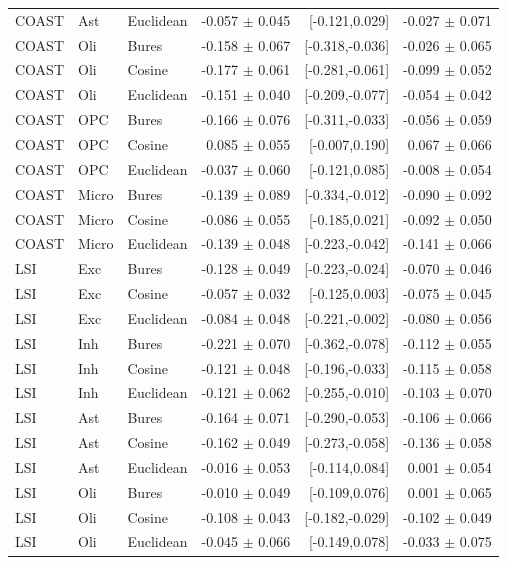 \documentclass[9pt]{article}
\begin{document}
\begin{landscape}
\begin{longtable}{lllrrr}
COAST & Ast & Euclidean & -0.057 $\pm$ 0.045 & [-0.121,0.029] & -0.027 $\pm$ 0.071 \\
COAST & Oli & Bures & -0.158 $\pm$ 0.067 & [-0.318,-0.036] & -0.026 $\pm$ 0.065 \\
COAST & Oli & Cosine & -0.177 $\pm$ 0.061 & [-0.281,-0.061] & -0.099 $\pm$ 0.052 \\
COAST & Oli & Euclidean & -0.151 $\pm$ 0.040 & [-0.209,-0.077] & -0.054 $\pm$ 0.042 \\
COAST & OPC & Bures & -0.166 $\pm$ 0.076 & [-0.311,-0.033] & -0.056 $\pm$ 0.059 \\
COAST & OPC & Cosine & 0.085 $\pm$ 0.055 & [-0.007,0.190] & 0.067 $\pm$ 0.066 \\
COAST & OPC & Euclidean & -0.037 $\pm$ 0.060 & [-0.121,0.085] & -0.008 $\pm$ 0.054 \\
COAST & Micro & Bures & -0.139 $\pm$ 0.089 & [-0.334,-0.012] & -0.090 $\pm$ 0.092 \\
COAST & Micro & Cosine & -0.086 $\pm$ 0.055 & [-0.185,0.021] & -0.092 $\pm$ 0.050 \\
COAST & Micro & Euclidean & -0.139 $\pm$ 0.048 & [-0.223,-0.042] & -0.141 $\pm$ 0.066 \\
LSI & Exc & Bures & -0.128 $\pm$ 0.049 & [-0.223,-0.024] & -0.070 $\pm$ 0.046 \\
LSI & Exc & Cosine & -0.057 $\pm$ 0.032 & [-0.125,0.003] & -0.075 $\pm$ 0.045 \\
LSI & Exc & Euclidean & -0.084 $\pm$ 0.048 & [-0.221,-0.002] & -0.080 $\pm$ 0.056 \\
LSI & Inh & Bures & -0.221 $\pm$ 0.070 & [-0.362,-0.078] & -0.112 $\pm$ 0.055 \\
LSI & Inh & Cosine & -0.121 $\pm$ 0.048 & [-0.196,-0.033] & -0.115 $\pm$ 0.058 \\
LSI & Inh & Euclidean & -0.121 $\pm$ 0.062 & [-0.255,-0.010] & -0.103 $\pm$ 0.070 \\
LSI & Ast & Bures & -0.164 $\pm$ 0.071 & [-0.290,-0.053] & -0.106 $\pm$ 0.066 \\
LSI & Ast & Cosine & -0.162 $\pm$ 0.049 & [-0.273,-0.058] & -0.136 $\pm$ 0.058 \\
LSI & Ast & Euclidean & -0.016 $\pm$ 0.053 & [-0.114,0.084] & 0.001 $\pm$ 0.054 \\
LSI & Oli & Bures & -0.010 $\pm$ 0.049 & [-0.109,0.076] & 0.001 $\pm$ 0.065 \\
LSI & Oli & Cosine & -0.108 $\pm$ 0.043 & [-0.182,-0.029] & -0.102 $\pm$ 0.049 \\
LSI & Oli & Euclidean & -0.045 $\pm$ 0.066 & [-0.149,0.078] & -0.033 $\pm$ 0.075 \\

\end{longtable}
\end{landscape}
\end{document}
